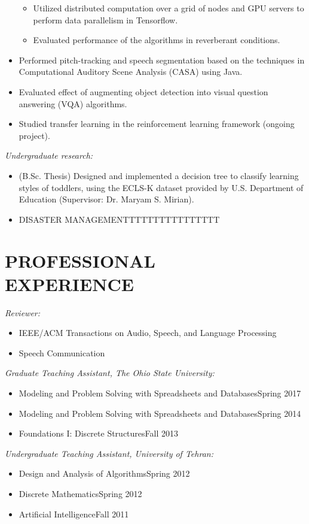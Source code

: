 \documentclass[margin, 10pt]{res}
\begin{document}
\begin{resume}
\begin{itemize}
\begin{itemize}
	\item Utilized distributed computation over a grid of nodes and GPU servers to perform data parallelism in Tensorflow.
	\item Evaluated performance of the algorithms in reverberant conditions.
	\end{itemize}
\item Performed pitch-tracking and speech segmentation based on the techniques in Computational Auditory Scene Analysis (CASA) using Java.
\item Evaluated effect of augmenting object detection into visual question answering (VQA) algorithms.
\item Studied transfer learning in the reinforcement learning framework (ongoing project).
\end{itemize}
\textit{Undergraduate research:}
\begin{itemize}\setlength\itemsep{-0.3em}
\item (B.Sc. Thesis) Designed and implemented a decision tree to classify learning styles of toddlers, using the ECLS-K dataset provided by U.S. Department of Education (Supervisor: Dr. Maryam S. Mirian).
\item DISASTER MANAGEMENTTTTTTTTTTTTTTTT
\end{itemize}
\section{PROFESSIONAL\\EXPERIENCE}
\textit{Reviewer:}
\begin{itemize}\setlength\itemsep{-0.3em}
\item IEEE/ACM Transactions on Audio, Speech, and Language Processing
\item Speech Communication
\end{itemize}
\textit{Graduate Teaching Assistant, The Ohio State University:}
\begin{itemize}\setlength\itemsep{-0.3em}
\item Modeling and Problem Solving with Spreadsheets and Databases\hfill {\footnotesize Spring 2017}
\item Modeling and Problem Solving with Spreadsheets and Databases\hfill {\footnotesize Spring 2014}
\item Foundations I: Discrete Structures\hfill {\footnotesize Fall 2013}
\end{itemize}
\textit{Undergraduate Teaching Assistant, University of Tehran:}
\begin{itemize}\setlength\itemsep{-0.3em}
\item Design and Analysis of Algorithms\hfill {\footnotesize Spring 2012}
\item Discrete Mathematics\hfill {\footnotesize Spring 2012}
\item Artificial Intelligence\hfill {\footnotesize Fall 2011}
\end{itemize}


\end{resume}
\end{document}
